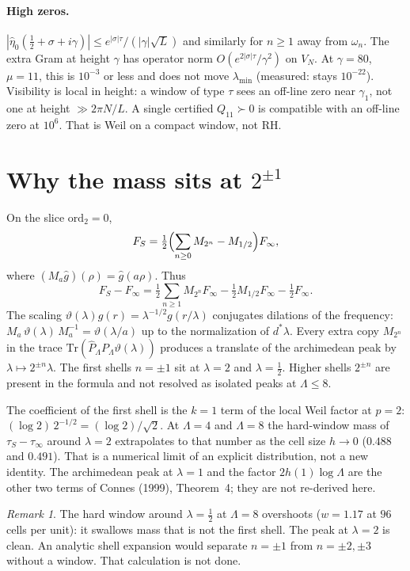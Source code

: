 \documentclass[11pt]{article}
\theoremstyle{remark}\newtheorem*{remark}{Remark}
\begin{document}
\paragraph{High zeros.}
$|\hat\eta_0(\tfrac12+\sigma+i\gamma)|\le e^{|\sigma|\tau}/(|\gamma|\sqrt L)$
and similarly for $n\ge1$ away from $\omega_n$. The extra Gram at height
$\gamma$ has operator norm $O(e^{2|\sigma|\tau}/\gamma^2)$ on $V_N$.
At $\gamma=80$, $\mu=11$, this is $10^{-3}$ or less and does not move
$\lambda_{\min}$ (measured: stays $10^{-22}$). Visibility is local in
height: a window of type $\tau$ sees an off-line zero near $\gamma_1$,
not one at height $\gg 2\pi N/L$. A single certified $Q_{11}\succ0$ is
compatible with an off-line zero at $10^6$. That is Weil on a compact
window, not RH.

\section{Why the mass sits at $2^{\pm1}$}
On the slice $\mathrm{ord}_2=0$,
\[
F_S=\tfrac12\Bigl(\sum_{n\ge0}M_{2^n}-M_{1/2}\Bigr)F_\infty,
\]
where $(M_a\hat g)(\rho)=\hat g(a\rho)$. Thus
\[
F_S-F_\infty=\tfrac12\sum_{n\ge1}M_{2^n}F_\infty-\tfrac12 M_{1/2}F_\infty-\tfrac12 F_\infty.
\]
The scaling $\vartheta(\lambda)g(r)=\lambda^{-1/2}g(r/\lambda)$
conjugates dilations of the frequency:
$M_a\,\vartheta(\lambda)\,M_a^{-1}=\vartheta(\lambda/a)$ up to the
normalization of $d^*\lambda$. Every extra copy $M_{2^n}$ in the trace
$\mathrm{Tr}(\hat P_\Lambda P_\Lambda\vartheta(\lambda))$ produces a
translate of the archimedean peak by $\lambda\mapsto 2^{\pm n}\lambda$.
The first shells $n=\pm1$ sit at $\lambda=2$ and $\lambda=\tfrac12$.
Higher shells $2^{\pm n}$ are present in the formula and not resolved
as isolated peaks at $\Lambda\le8$.

The coefficient of the first shell is the $k=1$ term of the local
Weil factor at $p=2$:
$(\log2)\,2^{-1/2}=(\log2)/\sqrt2$.
At $\Lambda=4$ and $\Lambda=8$ the hard-window mass of
$\tau_S-\tau_\infty$ around $\lambda=2$ extrapolates to that number
as the cell size $h\to0$ ($0.488$ and $0.491$). That is a numerical
limit of an explicit distribution, not a new identity. The
archimedean peak at $\lambda=1$ and the factor $2h(1)\log\Lambda$
are the other two terms of Connes (1999), Theorem~4; they are not
re-derived here.

\begin{remark}
The hard window around $\lambda=\tfrac12$ at $\Lambda=8$ overshoots
($w=1.17$ at $96$ cells per unit): it swallows mass that is not the
first shell. The peak at $\lambda=2$ is clean. An analytic shell
expansion would separate $n=\pm1$ from $n=\pm2,\pm3$ without a window.
That calculation is not done.
\end{remark}
\end{document}

